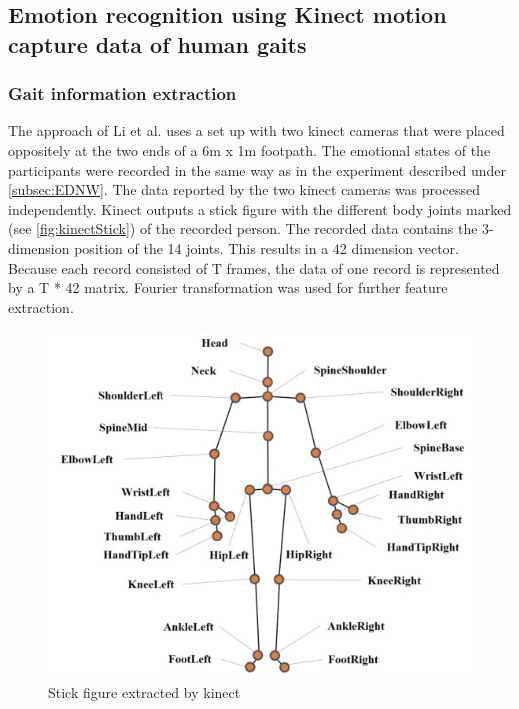 \documentclass[conference]{IEEEtran}
\begin{document}
\subsection{Emotion recognition using Kinect motion capture data of human gaits}
\subsubsection{Gait information extraction}
The approach of Li et al.\cite{li2016emotion} uses a set up with two kinect cameras that were placed oppositely at the two ends of a 6m x 1m footpath. The emotional states of the participants were recorded in the same way as in the experiment described under \autoref{subsec:EDNW}. The data reported by the two kinect cameras was processed independently\cite{li2016emotion}. Kinect outputs a stick figure with the different body joints marked (see \autoref{fig:kinectStick}) of the recorded person. The recorded data contains the 3-dimension position of the 14 joints\cite{li2016emotion}. This results in a 42 dimension vector. Because each record consisted of T frames, the data of one record is represented by a T * 42 matrix\cite{li2016emotion}. Fourier transformation was used for further feature extraction\cite{li2016emotion}. 

\begin{figure}[H]
\centering
\includegraphics[width=\linewidth]{kinectStick.jpg}
\caption{Stick figure extracted by kinect\cite{li2016emotion}}
\label{fig:kinectStick}
\end{figure}
\end{document}
